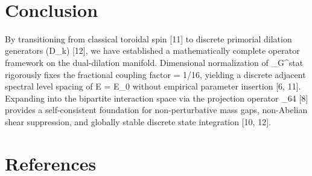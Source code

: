 \documentclass[12pt, a4paper]{article}
\begin{document}
​\section{Conclusion}
By transitioning from classical toroidal spin [11] to discrete primorial dilation generators (D_{k}) [12], we have established a mathematically complete operator framework on the dual-dilation manifold. Dimensional normalization of \hat{\Omega}_{G}^{stat} rigorously fixes the fractional coupling factor \kappa = 1/16, yielding a discrete adjacent spectral level spacing of \Delta E = E_{0} without empirical parameter insertion [6, 11]. Expanding into the bipartite interaction space via the projection operator \hat{\Pi}_{64} [8] provides a self-consistent foundation for non-perturbative mass gaps, non-Abelian shear suppression, and globally stable discrete state integration [10, 12].
​\section*{References}
\end{document}

